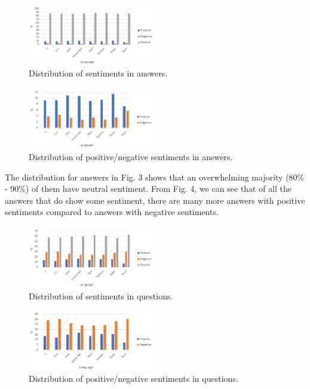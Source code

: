 \documentclass[conference]{IEEEtran}
\begin{document}
\begin{figure}[htbp]
\centerline{\includegraphics[width=0.49\textwidth]{figures/summNeutralA.png}}
\caption{Distribution of sentiments in answers.}
\label{fig}
\end{figure}

\begin{figure}[htbp]
\centerline{\includegraphics[width=0.49\textwidth]{figures/summA.png}}
\caption{Distribution of positive/negative sentiments in answers.}
\label{fig}
\end{figure}

The distribution for answers in Fig. 3 shows that an overwhelming majority (80\% - 90\%) of them have neutral sentiment. From Fig. 4, we can see that of all the answers that do show some sentiment, there are many more answers with positive sentiments compared to answers with negative sentiments.\\

\begin{figure}[htbp]
\centerline{\includegraphics[width=0.49\textwidth]{figures/summNeutralQ.png}}
\caption{Distribution of sentiments in questions.}
\label{fig}
\end{figure}

\begin{figure}[htbp]
\centerline{\includegraphics[width=0.49\textwidth]{figures/summQ.png}}
\caption{Distribution of positive/negative sentiments in questions.}
\label{fig}
\end{figure}
\end{document}
